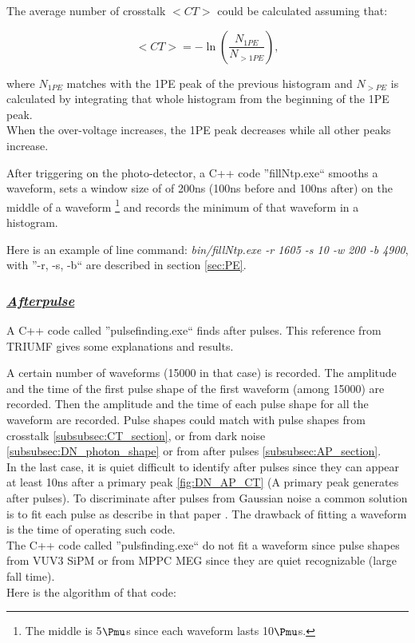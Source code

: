 \documentclass[a4paper, 11pt]{report}%
\newcommand{\TR}{TRIUMF }
\begin{document}
  The average number of crosstalk $<CT>$ could be calculated assuming that: 
  
  \begin{equation}\label{eq:CT}
    <CT> = -\ln(\frac{N_{1PE}}{N_{>1PE}}),
  \end{equation}
  
  where $N_{1PE}$ matches with the 1PE peak of the previous histogram and $N_{>PE}$ is calculated by integrating that whole 
  histogram from the beginning of the 1PE peak.\\ 
  When the over-voltage increases, the 1PE peak decreases while all other peaks increase. 
  
  After triggering on the photo-detector, a C++ code ''fillNtp.exe`` smooths a waveform, sets a window size of of 200ns 
  (100ns before and 100ns after) on the middle of a waveform \footnote{The middle is 5$\Pmu$s since each waveform lasts 10$\Pmu$s.}
  and records the minimum of that waveform in a histogram. 
  
  Here is an example of line command: \textit{bin/fillNtp.exe -r 1605 -s 10 -w 200 -b 4900},
  with ''-r, -s, -b`` are described in section \ref{sec:PE}.
  
  \subsubsection{\underline{\textit{Afterpulse}}}
  
  A C++ code called ''pulsefinding.exe`` finds after pulses. This reference \cite{ref:charac_SiPM_nEXO} from \TR gives some explanations 
  and results. 
  
  A certain number of waveforms (15000 in that case) is recorded. The amplitude and the time of the first pulse shape
  of the first waveform (among 15000) are recorded. Then the amplitude and the time of each pulse shape for all the waveform are 
  recorded. 
  Pulse shapes could match with pulse shapes from crosstalk \ref{subsubsec:CT_section}, or from dark noise 
  \ref{subsubsec:DN_photon_shape} or from after pulses \ref{subsubsec:AP_section}.
  \\
  
  In the last case, it is quiet difficult to identify after pulses since they can appear at least 10ns after a primary peak 
  \ref{fig:DN_AP_CT} (A primary peak generates after pulses). To discriminate 
  after pulses from Gaussian noise a common solution is to fit each pulse as describe in that paper \cite{ref:charac_SiPM_nEXO}.
  The drawback of fitting a waveform is the time of operating such code.\\
  The C++ code called ''pulsfinding.exe`` do not fit a waveform since pulse shapes from VUV3 SiPM or from MPPC MEG since they 
  are quiet recognizable (large fall time).\\
  Here is the algorithm of that code:
  
\end{document}
